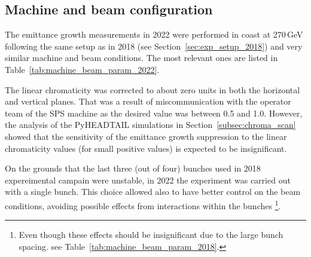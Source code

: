 \subsection{Machine and beam configuration}\label{sec:cc_md_2022_parameters}
The emittance growth measurements in 2022 were performed in coast at 270\,GeV following the same setup as in 2018 (see Section~\ref{sec:exp_setup_2018}) and very similar machine and beam conditions. The most relevant ones are listed in Table~\ref{tab:machine_beam_param_2022}. 

The linear chromaticity was corrected to about zero units in both the horizontal and vertical planes. That was a result of miscommunication with the operator team of the SPS machine as the desired value was between 0.5 and 1.0. However, the analysis of the PyHEADTAIL simulations in Section~\ref{subsec:chroma_scan} showed that the sensitivity of the emittance growth suppression to the linear chromaticity values (for small positive values) is expected to be insignificant. 

On the grounds that the last three (out of four) bunches used in 2018 expereimental campain were unstable, in 2022 the experiment was carried out with a single bunch. This choice allowed also to have better control on the beam conditions, avoiding possible effects from interactions within the bunches \footnote{Even though these effects should be insignificant due to the large bunch spacing. see Table~\ref{tab:machine_beam_param_2018}.}.


